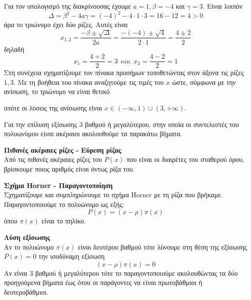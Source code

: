 \lysh
\begin{alist}
\item Για τον υπολογισμό της διακρίνουσας έχουμε $ a=1,\beta=-4 $ και $ \gamma=3 $. Είναι λοιπόν
\[ \varDelta=\beta^2-4a\gamma=(-4)^2-4\cdot1\cdot3=16-12=4>0 \]
άρα το τριώνυμο έχει δύο ρίζες. Αυτές είναι
\[ x_{1,2}=\frac{-\beta\pm\sqrt{\varDelta}}{2a}=\frac{-(-4)\pm\sqrt{4}}{2\cdot 1}=\frac{4\pm 2}{2} \]
δηλαδή \[ x_1=\frac{4+2}{2}=3\ \ \textrm{και}\ \ x_2=\frac{4-2}{2}=1 \]
Στη συνέχεια σχηματίζουμε τον πίνακα προσήμων τοποθετώντας στον άξονα τις ρίζες $ 1,3 $. Με τη βοήθεια του πίνακα αναζητούμε τις τιμές του $ x $ ώστε, σύμφωνα με την ανίσωση, το τριώνυμο να είναι θετικό
\begin{center}
\end{center}
οπότε οι λύσεις της ανίσωσης είναι $ x\in(-\infty,1)\cup(3,+\infty) $.
\end{alist}
\begin{Methodos}{9cm}
Για την επίλυση εξίσωσης 3 βαθμού ή μεγαλύτερου, στην οποία οι συντελεστές του πολυωνύμου είναι ακέραιοι ακολουθούμε τα παρακάτω βήματα.
\begin{bhma}
\item\textbf{Πιθανές ακέραιες ρίζες - Εύρεση ρίζας}\\
Από τις πιθανές ακέραιες ρίζες του $ P(x) $ που είναι οι διαιρέτες του σταθερού όρου, βρίσκουμε ποιος αριθμός είναι όντως ρίζα του.
\item \textbf{Σχήμα Horner - Παραγοντοποίηση}\\
Σχηματίζουμε και συμπληρώνουμε το σχήμα Horner με τη ρίζα που βρήκαμε. Παραγοντοποιούμε το πολυώνυμο ως εξής:
\[ P(x)=(x-\rho)\pi(x) \]
όπου $ \pi(x) $ είναι το πηλίκο.
\item \textbf{Λύση εξίσωσης}\\
Αν το πολυώνυμο $ \pi(x) $ είναι δευτέρου βαθμού τότε λύνουμε στη θέση της εξίσωσης $ P(x)=0 $ την ισοδύναμη εξίσωση
\[ (x-\rho)\pi(x)=0 \]
Αν είναι 3 βαθμού ή μεγαλύτερου τότε το παραγοντοποιούμε ακολουθώντας τα δύο προηγούμενα βήματα έως ότου οι παράγοντες να είναι πρωτοβάθμιοι ή δευτεροβάθμιοι.	
\end{bhma}
\end{Methodos}
